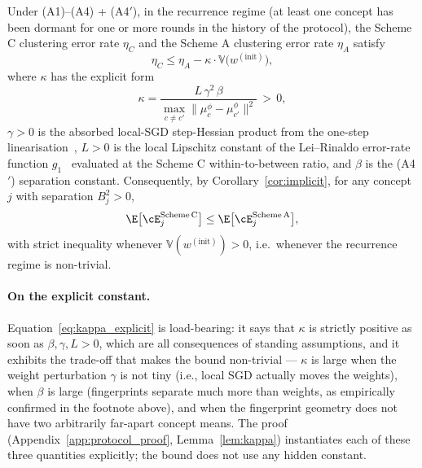 \begin{theorem}
\label{thm:protocol}
Under (A1)--(A4) + (A4$'$), in the recurrence regime (at least one concept has been dormant for one or more rounds in the history of the protocol), the Scheme C clustering error rate $\eta_C$ and the Scheme A clustering error rate $\eta_A$ satisfy
\begin{equation}
\eta_C \le \eta_A - \kappa \cdot \mathbb{V}\bigl(w^{(\mathrm{init})}\bigr),
\label{eq:eta_gap}
\end{equation}
where $\kappa$ has the explicit form
\begin{equation}
\kappa = \frac{L\,\gamma^2\,\beta}{\max_{c \ne c'} \|\mu_c^\phi - \mu_{c'}^\phi\|^2} \, > \, 0,
\label{eq:kappa_explicit}
\end{equation}
$\gamma > 0$ is the absorbed local-SGD step-Hessian product from the one-step linearisation~\citep{mania2016perturbed}, $L > 0$ is the local Lipschitz constant of the Lei--Rinaldo error-rate function $g_1$~\citep{lei2015consistency} evaluated at the Scheme C within-to-between ratio, and $\beta$ is the (A4$'$) separation constant. Consequently, by Corollary~\ref{cor:implicit}, for any concept $j$ with separation $B_j^2 > 0$,
\begin{equation}
\E\bigl[\cE_j^{\mathrm{Scheme\,C}}\bigr] \le \E\bigl[\cE_j^{\mathrm{Scheme\,A}}\bigr],
\label{eq:protocol_risk_ordering}
\end{equation}
with strict inequality whenever $\mathbb{V}(w^{(\mathrm{init})}) > 0$, i.e.\ whenever the recurrence regime is non-trivial.
\end{theorem}

\paragraph{On the explicit constant.} Equation~\eqref{eq:kappa_explicit} is load-bearing: it says that $\kappa$ is strictly positive as soon as $\beta, \gamma, L > 0$, which are all consequences of standing assumptions, and it exhibits the trade-off that makes the bound non-trivial --- $\kappa$ is large when the weight perturbation $\gamma$ is not tiny (i.e., local SGD actually moves the weights), when $\beta$ is large (fingerprints separate much more than weights, as empirically confirmed in the footnote above), and when the fingerprint geometry does not have two arbitrarily far-apart concept means. The proof (Appendix~\ref{app:protocol_proof}, Lemma~\ref{lem:kappa}) instantiates each of these three quantities explicitly; the bound does not use any hidden constant.

